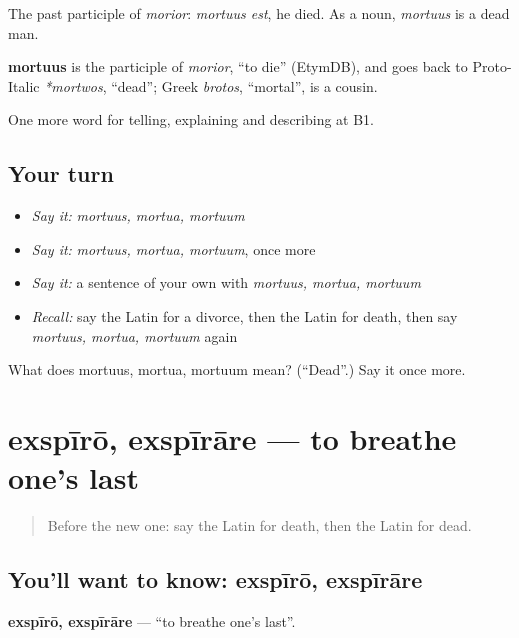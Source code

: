 The past participle of \emph{morior}: \emph{mortuus est}, he died. As a noun, \emph{mortuus} is a dead man.

\begin{cousinweb}
\textbf{mortuus} is the participle of \emph{morior}, \textquotedblleft{}to die\textquotedblright{} (EtymDB), and goes back to Proto-Italic \emph{*mortwos}, \textquotedblleft{}dead\textquotedblright{}; Greek \emph{brotos}, \textquotedblleft{}mortal\textquotedblright{}, is a cousin.
\end{cousinweb}

\begin{grammarlens}[title={What you've built}]
One more word for telling, explaining and describing at B1.
\end{grammarlens}

\subsection*{Your turn}
\begin{itemize}
\raggedright
  \item \emph{Say it:} \emph{mortuus, mortua, mortuum}
  \item \emph{Say it:} \emph{mortuus, mortua, mortuum}, once more
  \item \emph{Say it:} a sentence of your own with \emph{mortuus, mortua, mortuum}
  \item \emph{Recall:} say the Latin for a divorce, then the Latin for death, then say \emph{mortuus, mortua, mortuum} again
\end{itemize}

\begin{tcolorbox}[breakable,colback=teal!4,colframe=teal!35!black,title={Before you move on}]
What does mortuus, mortua, mortuum mean? (\textquotedblleft{}Dead\textquotedblright{}.) Say it once more.
\end{tcolorbox}
\section[exspīrō, exspīrāre]{exspīrō, exspīrāre — to breathe one's last}

\label{lesson:LA-C329-exspiro}



\begin{quote}
Before the new one: say the Latin for death, then the Latin for dead.
\end{quote}

\subsection*{You'll want to know: exspīrō, exspīrāre}
\textbf{exspīrō, exspīrāre} — \textquotedblleft{}to breathe one's last\textquotedblright{}.


